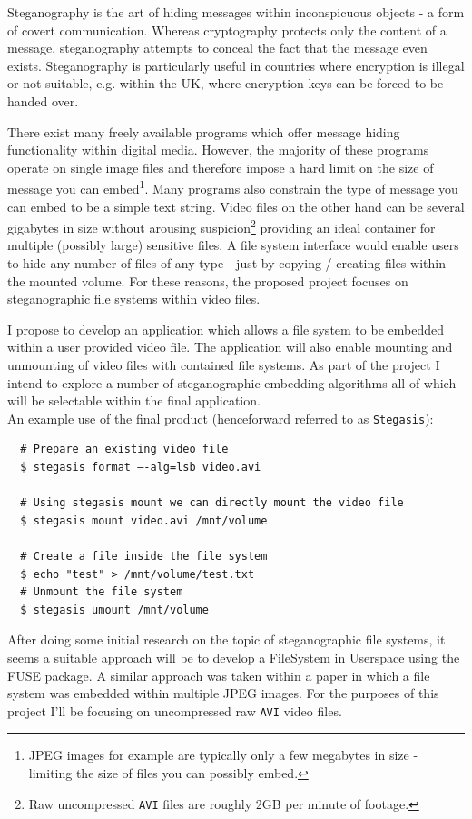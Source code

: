 \documentclass[paper=a4, fontsize=11pt,twoside]{scrartcl}    %
\numberwithin{table}{section}
\numberwithin{figure}{section}
\numberwithin{algorithm}{section}
\begin{document}
Steganography is the art of hiding messages within inconspicuous objects - a form of covert communication. Whereas cryptography protects only the content of a message, steganography attempts to conceal the fact that the message even exists. Steganography is particularly useful in countries where encryption is illegal or not suitable, e.g. within the UK, where encryption keys can be forced to be handed over.

There exist many freely available programs which offer message hiding functionality within digital media. However, the majority of these programs operate on single image files and therefore impose a hard limit on the size of message you can embed\footnote{JPEG images for example are typically only a few megabytes in size - limiting the size of files you can possibly embed.}. Many programs also constrain the type of message you can embed to be a simple text string. Video files on the other hand can be several gigabytes in size without arousing suspicion\footnote{Raw uncompressed \texttt{AVI} files are roughly 2GB per minute of footage.} providing an ideal container for multiple (possibly large) sensitive files. A file system interface would enable users to hide any number of files of any type - just by copying / creating files within the mounted volume. For these reasons, the proposed project focuses on steganographic file systems within video files.

I propose to develop an application which allows a file system to be embedded within a user provided video file. The application will also enable mounting and unmounting of video files with contained file systems. As part of the project I intend to explore a number of steganographic embedding algorithms all of which will be selectable within the final application.\\

\noindent
An example use of the final product (henceforward referred to as \texttt{Stegasis}):
\begin{verbatim}
  # Prepare an existing video file
  $ stegasis format –-alg=lsb video.avi
     
  # Using stegasis mount we can directly mount the video file
  $ stegasis mount video.avi /mnt/volume
 
  # Create a file inside the file system
  $ echo "test" > /mnt/volume/test.txt
  # Unmount the file system
  $ stegasis umount /mnt/volume
\end{verbatim}
 
After doing some initial research on the topic of steganographic file systems, it seems a suitable approach will be to develop a FileSystem in Userspace using the FUSE package. A similar approach was taken within a paper in which a file system was embedded within multiple JPEG images. For the purposes of this project I'll be focusing on uncompressed raw \texttt{AVI} video files.
 
\end{document}
